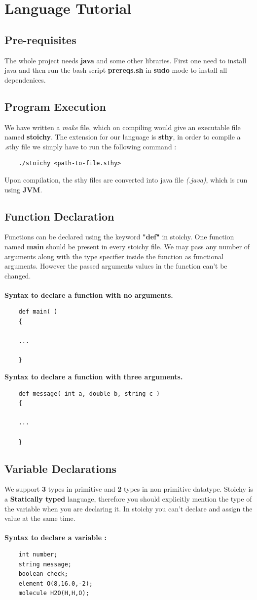 \documentclass[english,a4paper,12pt]{report}
\begin{document}
\chapter{Language Tutorial}
\section{Pre-requisites}
The whole project needs \textbf{java} and some other libraries. First one need to install java and then run the bash script \textbf{prereqs.sh} in \textbf{sudo} mode to install all dependenices.
\section{Program Execution }
We have written a \textit{make} file, which on compiling would give an executable file named \textbf{stoichy}. The extension for our language is \textbf{sthy}, in order to compile a .sthy file we simply have to run the following command :
\begin{verbatim}
    ./stoichy <path-to-file.sthy>
\end{verbatim}
Upon compilation, the sthy files are converted into java file \textit{(.java)}, which is run using \textbf{JVM}.
\section{Function Declaration }
Functions can be declared using the keyword \textbf{"def"} in stoichy. One function named \textbf{main} should be present in every stoichy file. We may pass any number of arguments along with the type specifier inside the function as functional arguments. However the passed arguments values in the function can't be changed.\\\\
\textbf{Syntax to declare a function with no arguments.}
\begin{verbatim}
    def main( )
    {
    
    ...
    
    }
\end{verbatim}
\newpage
\textbf{Syntax to declare a function with three arguments.}
\begin{verbatim}
    def message( int a, double b, string c )
    {
    
    ...
    
    }
\end{verbatim}
\section{Variable Declarations}
We support \textbf{3} types in primitive and \textbf{2} types in non primitive datatype. Stoichy is a \textbf{Statically typed} language, therefore you should explicitly mention the type of the variable when you are declaring it. In stoichy you can't declare and assign the value at the same time. \\\\
\textbf{Syntax to declare a variable :}
\begin{verbatim}
    int number;
    string message;
    boolean check;
    element O(8,16.0,-2);
    molecule H2O(H,H,O);
\end{verbatim}
\end{document}

